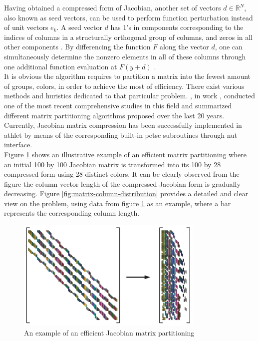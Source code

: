 

Having obtained a compressed form of Jacobian, another set of vectors $d \in \mathbb{R}^{N}$, also known as seed vectors, can be used to perform function perturbation instead of unit vectors $e_{k}$. A seed vector $d$ has 1’s in components corresponding to the indices of columns in a structurally orthogonal group of columns, and zeros in all other components \cite{gebremedhin2005color}. By differencing the function $F$ along the vector $d$, one can simultaneously determine the nonzero elements in all of these columns through one additional function evaluation at $F(y+d)$ \cite{gebremedhin2005color}.\\


It is obvious the algorithm requires to partition a matrix into the fewest amount of groups, colors, in order to achieve the most of efficiency. There exist various methods and huristics dedicated to that particular problem. \citeauthor{gebremedhin2005color}, in work \cite{gebremedhin2005color}, conducted one of the most recent comprehensive studies in this field and summarized different matrix partitioning algorithms proposed over the last 20 years. Currently, Jacobian matrix compression has been successfully implemented in \gls{athlet} by means of the corresponding built-in \gls{petsc} subroutines through \gls{nut} interface.\\


Figure \ref{fig:matrix-partitioning-example} shows an illustrative example of an efficient matrix partitioning where an initial 100 by 100 Jacobian matrix is transformed into its 100 by 28 compressed form using 28 distinct colors. It can be clearly observed from the figure the column vector length of the compressed Jacobian form is gradually decreasing. Figure \ref{fig:matrix-column-distribution} provides a detailed and clear view on the problem, using data from figure \ref{fig:matrix-partitioning-example} as an example, where a bar represents the corresponding column length.\\


\figpointer{\ref{fig:matrix-partitioning-example}}
\begin{figure}[htpb]
  \centering
  \includegraphics[width=0.8\textwidth]{figures/matrix-compression.png}
  \caption{An example of an efficient Jacobian matrix partitioning \cite{gebremedhin2005color}} \label{fig:matrix-partitioning-example}
\end{figure}


